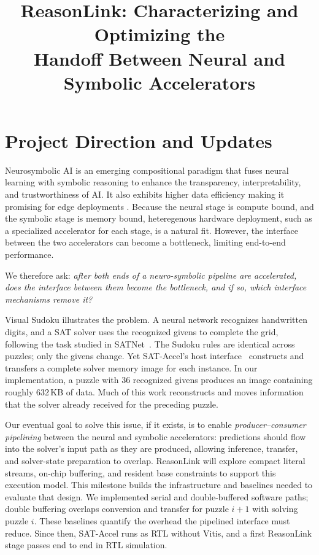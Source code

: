\documentclass[conference,10pt,letterpaper]{IEEEtran}
\title{ReasonLink: Characterizing and Optimizing the\\Handoff Between Neural and Symbolic Accelerators}
\author{\IEEEauthorblockN{Vayun Gupta (vg2684), Aaron Mano Cherian (amc2535)}
\IEEEauthorblockA{COMS 6998: AI-Native Computing $\mid$ Fall 2026\\
P1: Exploration \& Progress $\mid$ Due October 26, 2026, 11:59 PM ET}}
\begin{document}
\maketitle
\thispagestyle{plain}
\pagestyle{plain}

\section{Project Direction and Updates}
Neurosymbolic AI is an emerging compositional paradigm that fuses neural learning with symbolic reasoning to enhance the transparency, interpretability, and trustworthiness of
AI. It also exhibits higher data efficiency making it promising for edge deployments \cite{cogsys}. Because the neural stage is compute bound, and the symbolic stage is memory bound, heteregenous hardware deployment, such as a specialized accelerator for each stage, is a natural fit. 
However, the interface between the two accelerators can become a bottleneck, limiting end-to-end performance. 

We therefore ask: \emph{after both ends of a neuro-symbolic pipeline are accelerated, does the interface between them become the bottleneck, and if so, which interface mechanisms remove it?} 

Visual Sudoku illustrates the problem. A neural network recognizes handwritten digits, and a SAT solver uses the recognized givens to complete the grid, following the task studied in SATNet~\cite{satnet}. The Sudoku rules are identical across puzzles; only the givens change. Yet SAT-Accel's host interface~\cite{sataccel} constructs and transfers a complete solver memory image for each instance. In our implementation, a puzzle with 36 recognized givens produces an image containing roughly 632\,KB of data. Much of this work reconstructs and moves information that the solver already received for the preceding puzzle.

Our eventual goal to solve this issue, if it exists, is to enable \emph{producer--consumer pipelining} between the neural and symbolic accelerators: predictions should flow into the solver's input path as they are produced, allowing inference, transfer, and solver-state preparation to overlap. ReasonLink will explore compact literal streams, on-chip buffering, and resident base constraints to support this execution model. This milestone builds the infrastructure and baselines needed to evaluate that design. We implemented serial and double-buffered software paths; double buffering overlaps conversion and transfer for puzzle $i{+}1$ with solving puzzle $i$. These baselines quantify the overhead the pipelined interface must reduce. Since then, SAT-Accel runs as RTL without Vitis, and a first ReasonLink stage passes end to end in RTL simulation.
\end{document}
